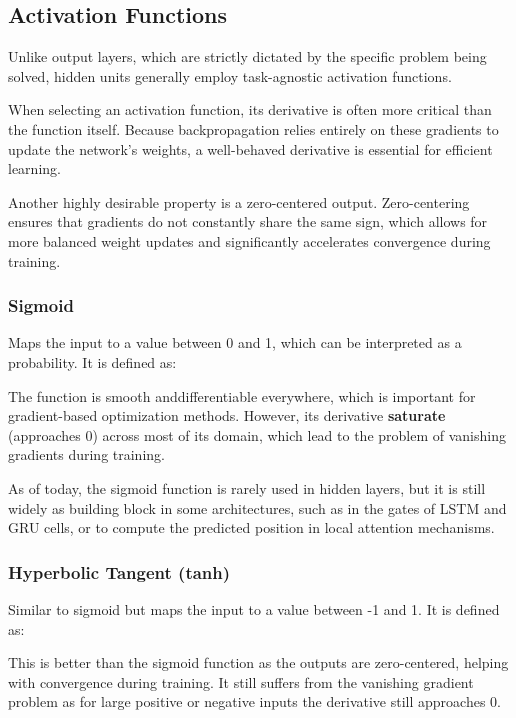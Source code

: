 \subsection{Activation Functions}
Unlike output layers, which are strictly dictated by the specific problem being solved, hidden units generally employ task-agnostic activation functions.

When selecting an activation function, its derivative is often more critical than the function itself. 
Because backpropagation relies entirely on these gradients to update the network's weights, a well-behaved derivative is essential for efficient learning.

Another highly desirable property is a zero-centered output. 
Zero-centering ensures that gradients do not constantly share the same sign, 
which allows for more balanced weight updates and significantly accelerates convergence during training.

\subsubsection{Sigmoid}
Maps the input to a value between 0 and 1, which can be interpreted as a probability. It is defined as:
\begin{figure}[H]
    \centering
    
\end{figure}
The function is smooth anddifferentiable everywhere, which is important for gradient-based optimization methods.
However, its derivative \textbf{saturate} (approaches 0) across most of its domain, which lead to the problem of vanishing gradients during training.

As of today, the sigmoid function is rarely used in hidden layers, but it is still widely as building block in some architectures,
such as in the gates of LSTM and GRU cells, or to compute the predicted position in local attention mechanisms.

\subsubsection{Hyperbolic Tangent (tanh)}
Similar to sigmoid but maps the input to a value between -1 and 1. It is defined as:
\begin{figure}[H]
    \centering
    
\end{figure}
This is better than the sigmoid function as the outputs are zero-centered, helping with convergence during training.
It still suffers from the vanishing gradient problem as for large positive or negative inputs the derivative still approaches 0.

